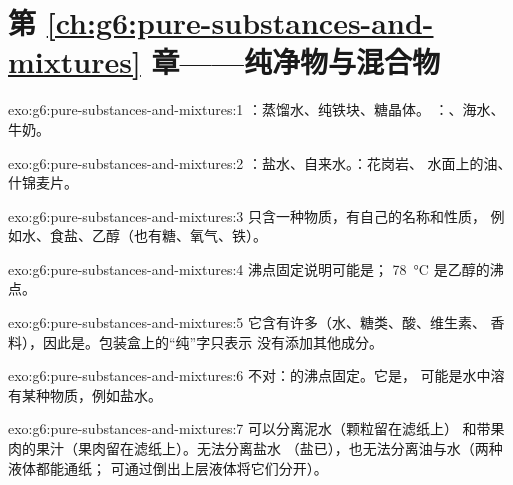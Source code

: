 \section*{第 \ref{ch:g6:pure-substances-and-mixtures} 章——纯净物与混合物}

\begin{solution}{exo:g6:pure-substances-and-mixtures:1}
：蒸馏水、纯铁块、糖晶体。
：、海水、牛奶。
\end{solution}

\begin{solution}{exo:g6:pure-substances-and-mixtures:2}
：盐水、自来水。：花岗岩、
水面上的油、什锦麦片。
\end{solution}

\begin{solution}{exo:g6:pure-substances-and-mixtures:3}
只含一种物质，有自己的名称和性质，
例如水、食盐、乙醇（也有糖、氧气、铁）。
\end{solution}

\begin{solution}{exo:g6:pure-substances-and-mixtures:4}
沸点固定说明可能是；
\qty{78}{\celsius} 是乙醇的沸点。
\end{solution}

\begin{solution}{exo:g6:pure-substances-and-mixtures:5}
它含有许多（水、糖类、酸、维生素、
香料），因此是。包装盒上的“纯”字只表示
没有添加其他成分。
\end{solution}

\begin{solution}{exo:g6:pure-substances-and-mixtures:6}
不对：的沸点固定。它是，
可能是水中溶有某种物质，例如盐水。
\end{solution}

\begin{solution}{exo:g6:pure-substances-and-mixtures:7}
可以分离泥水（颗粒留在滤纸上）
和带果肉的果汁（果肉留在滤纸上）。无法分离盐水
（盐已），也无法分离油与水（两种液体都能通纸；
可通过倒出上层液体将它们分开）。
\end{solution}


